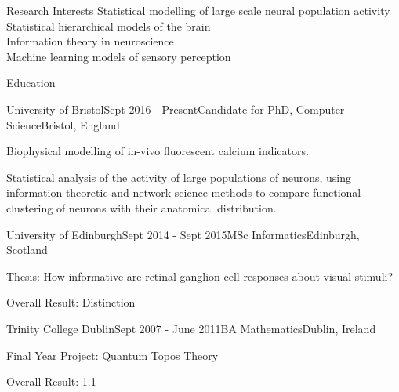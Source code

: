 \documentclass{resume} %
\begin{document}

\begin{rSection}{Research Interests}
  Statistical modelling of large scale neural population activity \\
  Statistical hierarchical models of the brain \\
  Information theory in neuroscience \\
  Machine learning models of sensory perception 
\end{rSection}


\begin{rSection}{Education}
  \begin{rSubsection}{University of Bristol}{Sept 2016 - Present}{Candidate for PhD, Computer Science}{Bristol, England}
    \item Biophysical modelling of in-vivo fluorescent calcium indicators.
    \item Statistical analysis of the activity of large populations of neurons, using information theoretic and network science methods to compare functional clustering of neurons with their anatomical distribution.
  \end{rSubsection}
  
  \begin{rSubsection}{University of Edinburgh}{Sept 2014 - Sept 2015}{MSc Informatics}{Edinburgh, Scotland}
    \item Thesis: How informative are retinal ganglion cell responses about visual stimuli?
    \item Overall Result: Distinction
  \end{rSubsection}

  \begin{rSubsection}{Trinity College Dublin}{Sept 2007 - June 2011}{BA Mathematics}{Dublin, Ireland}
    \item Final Year Project: Quantum Topos Theory 
    \item Overall Result: 1.1
  \end{rSubsection}

\end{rSection}
\end{document}
